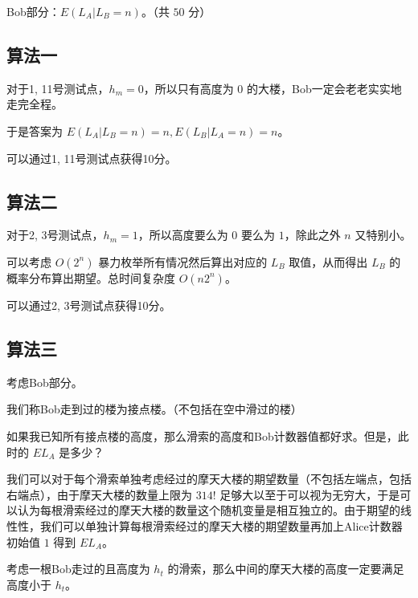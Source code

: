 \documentclass[11pt, a4paper]{article}
\begin{document}
Bob部分：$E(L_A | L_B = n)$。（共 $50$ 分）

\subsection*{算法一}
对于1, 11号测试点，$h_m = 0$，所以只有高度为 $0$ 的大楼，Bob一定会老老实实地走完全程。

于是答案为 $E(L_A | L_B = n) = n, E(L_B | L_A = n) = n$。

可以通过1, 11号测试点获得10分。

\subsection*{算法二}
对于2, 3号测试点，$h_m = 1$，所以高度要么为 $0$ 要么为 $1$，除此之外 $n$ 又特别小。

可以考虑 $O(2^n)$ 暴力枚举所有情况然后算出对应的 $L_B$ 取值，从而得出 $L_B$ 的概率分布算出期望。总时间复杂度 $O(n 2^n)$。

可以通过2, 3号测试点获得10分。

\subsection*{算法三}
考虑Bob部分。

我们称Bob走到过的楼为接点楼。（不包括在空中滑过的楼）

如果我已知所有接点楼的高度，那么滑索的高度和Bob计数器值都好求。但是，此时的 $EL_A$ 是多少？

我们可以对于每个滑索单独考虑经过的摩天大楼的期望数量（不包括左端点，包括右端点），由于摩天大楼的数量上限为 $314!$ 足够大以至于可以视为无穷大，于是可以认为每根滑索经过的摩天大楼的数量这个随机变量是相互独立的。由于期望的线性性，我们可以单独计算每根滑索经过的摩天大楼的期望数量再加上Alice计数器初始值 $1$ 得到 $EL_A$。

考虑一根Bob走过的且高度为 $h_t$ 的滑索，那么中间的摩天大楼的高度一定要满足高度小于 $h_t$。
\end{document}

